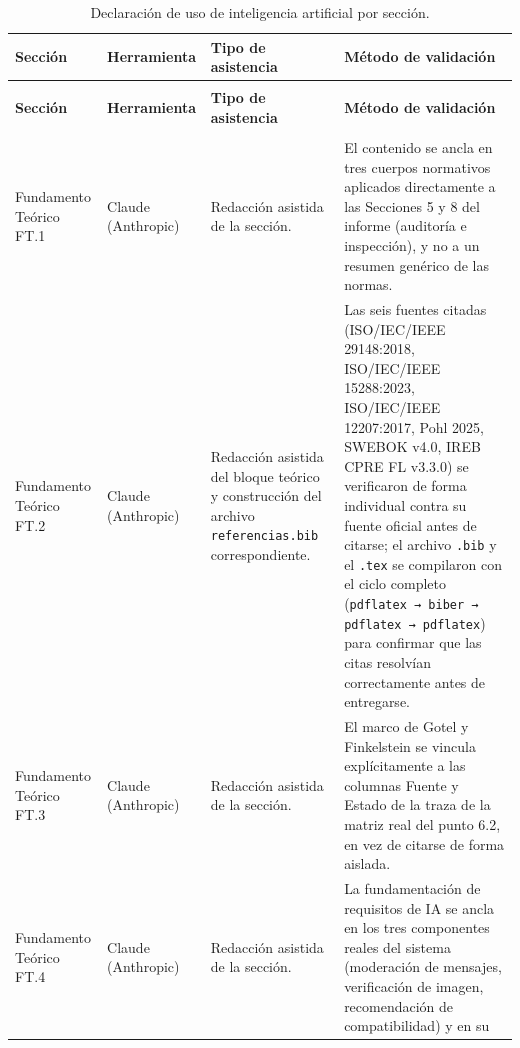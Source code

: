 \documentclass[journal,onecolumn]{IEEEtran}
\begin{document}
	\renewcommand{\arraystretch}{1.3}
	\footnotesize
	\begin{longtable}{
			|>{\raggedright\arraybackslash}p{3.2cm}
			|>{\raggedright\arraybackslash}p{1.8cm}
			|>{\raggedright\arraybackslash}p{4.3cm}
			|>{\raggedright\arraybackslash}p{5cm}|}
		\caption{Declaración de uso de inteligencia artificial por sección.}
		\label{tab:declaracion-ia} \\
		\hline
		\textbf{Sección} & \textbf{Herramienta} & \textbf{Tipo de asistencia} & \textbf{Método de validación} \\
		\hline
		\endfirsthead
		\multicolumn{4}{l}{\small\itshape (continuación de la Tabla~\ref{tab:declaracion-ia})} \\
		\hline
		\textbf{Sección} & \textbf{Herramienta} & \textbf{Tipo de asistencia} & \textbf{Método de validación} \\
		\hline
		\endhead
		\hline
		\multicolumn{4}{r}{\small\itshape (continúa en la página siguiente)} \\
		\endfoot
		\hline
		\endlastfoot
		Fundamento Teórico FT.1 &
		Claude (Anthropic) &
		Redacción asistida de la sección. &
		El contenido se ancla en tres cuerpos normativos aplicados
		directamente a las Secciones 5 y 8 del informe (auditoría e
		inspección), y no a un resumen genérico de las normas. \\
		\hline
		Fundamento Teórico FT.2 &
		Claude (Anthropic) &
		Redacción asistida del bloque teórico y construcción del archivo
		\texttt{referencias.bib} correspondiente. &
		Las seis fuentes citadas (ISO/IEC/IEEE 29148:2018, ISO/IEC/IEEE
		15288:2023, ISO/IEC/IEEE 12207:2017, Pohl 2025, SWEBOK v4.0, IREB
		CPRE FL v3.3.0) se verificaron de forma individual contra su
		fuente oficial antes de citarse; el archivo \texttt{.bib} y el
		\texttt{.tex} se compilaron con el ciclo completo (\texttt{pdflatex
			→ biber → pdflatex → pdflatex}) para confirmar que las citas
		resolvían correctamente antes de entregarse. \\
		\hline
		Fundamento Teórico FT.3 &
		Claude (Anthropic) &
		Redacción asistida de la sección. &
		El marco de Gotel y Finkelstein se vincula explícitamente a las
		columnas Fuente y Estado de la traza de la matriz real del punto
		6.2, en vez de citarse de forma aislada. \\
		\hline
		Fundamento Teórico FT.4 &
		Claude (Anthropic) &
		Redacción asistida de la sección. &
		La fundamentación de requisitos de IA se ancla en los tres
		componentes reales del sistema (moderación de mensajes,
		verificación de imagen, recomendación de compatibilidad) y en su

\end{longtable}
\end{document}

